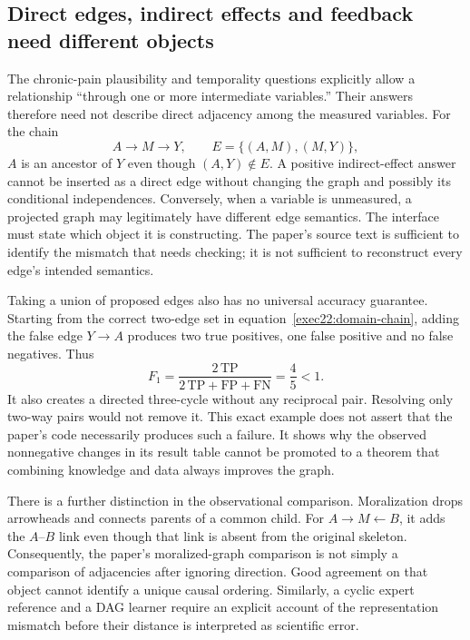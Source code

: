 \subsection{Direct edges, indirect effects and feedback need different objects}
\label{exec22:domain-semantics}

The chronic-pain plausibility and temporality questions explicitly allow a
relationship ``through one or more intermediate variables.'' Their answers
therefore need not describe direct adjacency among the measured variables.
For the chain
\begin{equation}
 A\longrightarrow M\longrightarrow Y,
 \qquad E=\{(A,M),(M,Y)\},
 \label{exec22:domain-chain}
\end{equation}
\(A\) is an ancestor of \(Y\) even though \((A,Y)\notin E\). A positive
indirect-effect answer cannot be inserted as a direct edge without changing the
graph and possibly its conditional independences. Conversely, when a variable
is unmeasured, a projected graph may legitimately have different edge semantics.
The interface must state which object it is constructing. The paper's source
text is sufficient to identify the mismatch that needs checking; it is not
sufficient to reconstruct every edge's intended semantics. \cite{exec22_domain_lin,exec22_domain_reference}

Taking a union of proposed edges also has no universal accuracy guarantee.
Starting from the correct two-edge set in equation~\eqref{exec22:domain-chain},
adding the false edge \(Y\to A\) produces two true positives, one false positive
and no false negatives. Thus
\begin{equation}
 F_1=\frac{2\,\mathrm{TP}}{2\,\mathrm{TP}+\mathrm{FP}+\mathrm{FN}}
     =\frac45<1.
 \label{exec22:domain-f1}
\end{equation}
It also creates a directed three-cycle without any reciprocal pair. Resolving
only two-way pairs would not remove it. This exact example does not assert that
the paper's code necessarily produces such a failure. It shows why the observed
nonnegative changes in its result table cannot be promoted to a theorem that
combining knowledge and data always improves the graph. \cite{exec22_domain_reference}

There is a further distinction in the observational comparison. Moralization
drops arrowheads and connects parents of a common child. For
\(A\to M\leftarrow B\), it adds the \(A\)--\(B\) link even though that link
is absent from the original skeleton. Consequently, the paper's moralized-graph
comparison is not simply a comparison of adjacencies after ignoring direction.
Good agreement on that object cannot identify a unique causal ordering. Similarly,
a cyclic expert reference and a DAG learner require an explicit account of the
representation mismatch before their distance is interpreted as scientific error.

